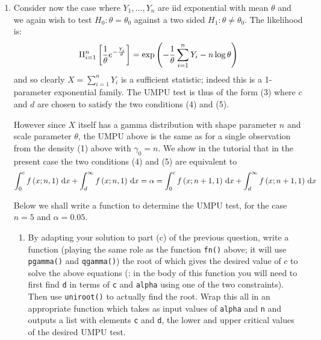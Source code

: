 \documentclass[12pt, a4paper]{article}\usepackage[]{graphicx}\usepackage[]{color}
\newenvironment{knitrout}{}{} %
\begin{document}
\begin{enumerate}[label = {\bfseries \arabic*.}]
\begin{enumerate}[label = (\alph*)]
{\begin{knitrout}
{}


\end{knitrout}
  
  }
  \end{enumerate}
\item Consider now the case where $Y_1, ..., Y_n$ are iid exponential with mean $\theta$ and we again wish to test $H_0: \theta = \theta_0$ against a two sided $H_1: \theta \neq \theta_0$. The likelihood is:
$$\Pi_{i = 1}^n\left[\frac{1}{\theta}e^{-\frac{Y_i}{\theta}}\right] = \exp\left(-\frac{1}{\theta}\sum_{i = 1}^nY_i - n\log\theta\right)$$
and so clearly $X = \sum_{i = 1}^nY_i$ is a sufficient statistic; indeed this is a 1-parameter exponential family. The UMPU test is thus of the form (3) where $c$ and $d$ are chosen to satisfy the two conditions (4) and (5).

However since $X$ itself has a gamma distribution with shape parameter $n$ and scale parameter $\theta$, the UMPU above is the same as for a single observation from the density (1) above with $\gamma_0 = n$. We show in the tutorial that in the present case the two conditions (4) and (5) are equivalent to
$$ \int_0^cf\left(x; n, 1\right)\, \text{d}x + \int_d^\infty f\left(x; n, 1\right)\, \text{d}x = \alpha = \int_0^c f\left(x; n + 1, 1\right)\, \text{d}x + \int_d^\infty f\left(x; n + 1, 1\right)\, \text{d}x$$

Below we shall write a function to determine the UMPU test, for the case $n = 5$ and $\alpha = 0.05$.
\begin{enumerate}[label=(\alph*)]
  \item By adapting your solution to part (c) of the previous question, write a function (playing the same role as the function \verb+fn()+ above; it will use \verb+pgamma()+ and \verb+qgamma()+) the root of which gives the desired value of $c$ to solve the above equations (: in the body of this function you will need to first find \verb+d+ in terms of \verb+c+ and \verb+alpha+ using one of the two constraints). Then use \verb+uniroot()+ to actually find the root. Wrap this all in an appropriate function which takes as input values of \verb+alpha+ and \verb+n+ and outputs a list with elements \verb+c+ and \verb+d+, the lower and upper critical values of the desired UMPU test.
  
  {\setlength{\leftskip}{3ex}
  
}
\end{enumerate}
\end{enumerate}
\end{document}

